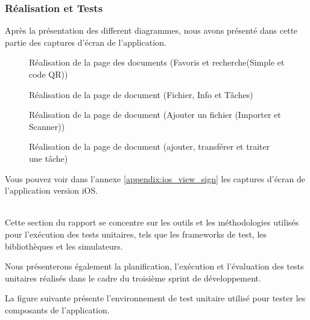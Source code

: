 \subsubsection{Réalisation et Tests}
Après la présentation des different diagrammes, nous avons présenté dans cette partie des captures d'écran de l'application.

\begin{figure}[H]
  \centering
  \caption{Réalisation de la page des documents (Favoris et recherche(Simple et code QR))}
  \label{fig:realisation_documents1}
\end{figure}

\begin{figure}[H]
  \centering
  \caption{Réalisation de la page de document (Fichier, Info et Tâches)}
  \label{fig:realisation_documents2}
\end{figure}

\begin{figure}[H]
  \centering
  \caption{Réalisation de la page de document (Ajouter un fichier (Importer et Scanner))}
  \label{fig:realisation_documents3}
\end{figure}

\begin{figure}[H]
  \centering
  \caption{Réalisation de la page de document (ajouter, transférer et traiter une tâche)}
  \label{fig:realisation_documents4}
\end{figure}

Vous pouvez voir dans l'annexe \ref{appendix:ios_view_sign} les captures d'écran de l'application version iOS.

 \\
Cette section du rapport se concentre sur les outils et les méthodologies utilisés pour l'exécution des tests unitaires, tels que les frameworks de test, les bibliothèques et les simulateurs.

Nous présenterons également la planification, l'exécution et l'évaluation des tests unitaires réalisés dans le cadre du troisième sprint de développement.


La figure suivante présente l'environnement de test unitaire utilisé pour tester les composants de l'application.

